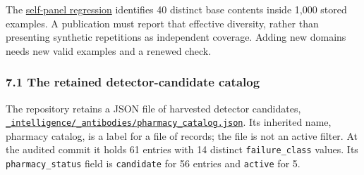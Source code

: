 \documentclass[
  11pt,
]{article}
\newcommand{\passthrough}[1]{#1}
\begin{document}
The
\href{https://github.com/dbccpage/the_symbol_game/blob/52cb5457f6c485ba548cfd292f6012a941ed22cf/pfp/tests/test_immune_defect_regressions.py}{self-panel
regression} identifies 40 distinct base contents inside 1,000 stored
examples. A publication must report that effective diversity, rather
than presenting synthetic repetitions as independent coverage. Adding
new domains needs new valid examples and a renewed check.

\subsubsection{7.1 The retained detector-candidate
catalog}\label{the-retained-detector-candidate-catalog}

The repository retains a JSON file of harvested detector candidates,
\href{https://github.com/dbccpage/the_symbol_game/blob/52cb5457f6c485ba548cfd292f6012a941ed22cf/_intelligence/_antibodies/pharmacy_catalog.json}{\nolinkurl{_intelligence/_antibodies/pharmacy_catalog.json}}.
Its inherited name, pharmacy catalog, is a label for a file of records;
the file is not an active filter. At the audited commit it holds 61
entries with 14 distinct \nolinkurl{failure_class} values. Its
\nolinkurl{pharmacy_status} field is \passthrough{\lstinline!candidate!}
for 56 entries and \passthrough{\lstinline!active!} for 5.
\end{document}
